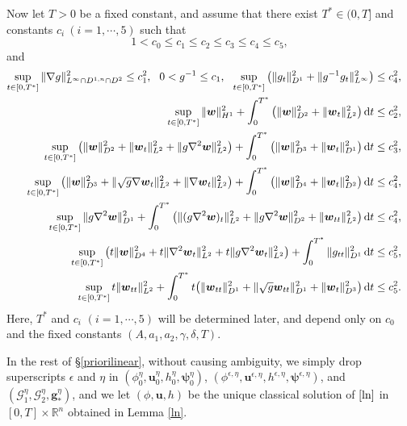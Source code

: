 \documentclass[11pt,reqno]{amsart}
\numberwithin{rk}{section}
\numberwithin{prop}{section}
\numberwithin{mydef}{section}
\numberwithin{lem}{section}
\numberwithin{equation}{section}
\numberwithin{thm}{section}
\begin{document}
\medskip
Now let $T>0$ be a fixed constant, and  assume that there exist $T^*\in(0,T]$ and constants $c_i \ (i=1,\cdots\!,5)$ such that
\begin{equation*} 
1<c_0\leq c_1\leq c_2\leq c_3\leq c_4\leq c_5,
\end{equation*}
and
\begin{align}
\sup_{t\in [0,T^*]}\|\nabla g\|^2_{L^\infty\cap D^{1,n}\cap D^2}\leq c_1^2, \ \ 
0<g^{-1}\leq c_1,\ \  \sup_{t\in [0,T^*]}\big(\|g_t\|^2_{D^1}+\|g^{-1}g_t\|^2_{L^\infty}\big)\leq c^2_4,\notag\\
\sup_{t\in [0,T^*]}\|\boldsymbol{w}\|^2_{H^1}+\int^{T^*}_0\big(\|\boldsymbol{w}\|^2_{D^2}+\|\boldsymbol{w}_t\|^2_{L^2}\big)\,\mathrm{d}t\leq c_2^2,\notag\\
\sup_{t\in [0,T^*]}\big(\|\boldsymbol{w}\|^2_{D^2}+\|\boldsymbol{w}_t\|^2_{L^2}+\|g\nabla^2\boldsymbol{w}\|^2_{L^2}\big)+\int^{T^*}_0\big(\|\boldsymbol{w}\|_{D^3}^2+\|\boldsymbol{w}_t\|^2_{D^1}\big)\,\mathrm{d}t\leq c_3^2,\notag\\
\sup_{t\in [0,T^*]}\big(\|\boldsymbol{w}\|^2_{D^3}+\|\sqrt{g}\nabla \boldsymbol{w}_t\|^2_{L^2}+\|\nabla \boldsymbol{w}_t\|^2_{L^2}\big)+\int^{T^*}_0\big(\|\boldsymbol{w}\|^2_{D^4}+\|\boldsymbol{w}_t\|^2_{D^2}\big)\,\mathrm{d}t\leq c_4^2,\label{2.16}\\
\sup_{t\in [0,T^*]}\|g\nabla^2\boldsymbol{w}\|^2_{D^1}+\int^{T^*}_0\big(\|(g\nabla^2\boldsymbol{w})_t\|^2_{L^2}+\|g\nabla^2\boldsymbol{w}\|^2_{D^2}+\|\boldsymbol{w}_{tt}\|^2_{L^2}\big)\,\mathrm{d}t\leq c_4^2,\notag\\
\sup_{t\in [0,T^*]}\big(t\|\boldsymbol{w}\|^2_{D^4}+t\|\nabla^2\boldsymbol{w}_t\|^2_{L^2}+t\|g\nabla^2\boldsymbol{w}_t\|^2_{L^2}\big)+\int^{T^*}_0\|g_{tt}\|^2_{D^1}\,\mathrm{d}t\leq c^2_5,&\notag\\ 
\sup_{t\in [0,T^*]}t\|\boldsymbol{w}_{tt}\|^2_{L^2}+\int^{T^*}_0t\big(\|\boldsymbol{w}_{tt}\|^2_{D^1}+\|\sqrt{g}\boldsymbol{w}_{tt}\|_{D^1}^2+\|\boldsymbol{w}_t\|^2_{D^3}\big)\,\mathrm{d}t\leq c_5^2.\notag
\end{align}
Here, $T^*$ and $c_i$ $(i=1,\cdots\!,5)$ will be determined later, and depend only on $c_0$ and the fixed constants $(A, a_1,a_2,\gamma,\delta, T)$.


In  the rest of \S \ref{priorilinear}, without causing ambiguity,
we simply drop superscripts $\epsilon$ and $\eta$ in 
$(\phi^\eta_0,\boldsymbol{u}^\eta_0,h^\eta_0,\boldsymbol{\psi}^\eta_0)$, 
$(\phi^{\epsilon,\eta},\boldsymbol{u}^{\epsilon,\eta},h^{\epsilon,\eta},\boldsymbol{\psi}^{\epsilon,\eta})$, and $(\mathcal{G}^\eta_1,\mathcal{G}^\eta_2,\boldsymbol{g}_*^\eta)$, and we let  $(\phi,\boldsymbol{u},h)$ be the unique classical solution of $\eqref{ln}$ in $[0,T]\times\mathbb{R}^n$ obtained in Lemma \ref{ln}. 
\end{document}
